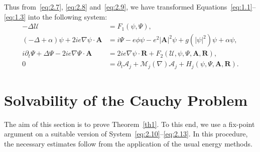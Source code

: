 \documentclass[10pt]{amsart}
\theoremstyle{definition}\newtheorem{defi}[theo]{Definition}\newtheorem{rema}[theo]{Remark}\newtheorem{exam}[theo]{Example}\newtheorem{exem}[theo]{Example}\newtheorem{nota}[theo]{Notation}
\newcommand{\BA}{\mathbf{A}}
\newcommand{\BR}{\mathbf{R}}
\begin{document}
Thus from~\eqref{eq:2.7}, \eqref{eq:2.8} and~\eqref{eq:2.9}, we have transformed Equations~\eqref{eq:1.1}--\eqref{eq:1.3} into the following system:
\begin{align}
-\Delta \mathcal{U} &= F_1(\psi,\Psi), \label{eq:2.10}
\\
(-\Delta+\alpha)\psi + 2 ie \nabla \psi\cdot \BA &= i \Psi-e\phi \psi -e^2 |\BA|^2 \psi +g(|\psi|^2)\psi+\alpha \psi, \label{eq:2.11}
\\
i\partial_t \Psi +\Delta \Psi -2i e \nabla \Psi \cdot \BA &= 2ie \nabla\psi \cdot \BR +F_2(\mathcal{U},\psi,\Psi,\BA,\BR), \label{eq:2.12}
\\
0&=\partial_t \mathcal{A}_j+\mathcal{M}_j(\nabla)\mathcal{A}_j +H_j(\psi,\Psi,\BA,\BR). \label{eq:2.13}
\end{align}


\section{Solvability of the Cauchy Problem}\label{sec3}

The aim of this section is to prove Theorem~\ref{th1}. To this end, we use a fix-point argument on a suitable version of System~\eqref{eq:2.10}--\eqref{eq:2.13}. In this procedure, the necessary estimates follow from the application of the usual energy methods.
\end{document}
